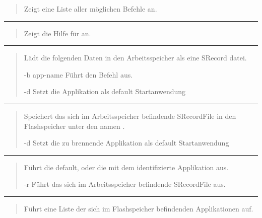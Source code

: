 \documentclass[letterpaper,10pt,ngerman]{manual}
\begin{document}
\begin{quote}

Zeigt eine Liste aller möglichen Befehle an.
\end{quote}


\bigskip\hrule{}\bigskip


\begin{quote}

Zeigt die Hilfe für  an.
\end{quote}


\bigskip\hrule{}\bigskip


\begin{quote}

Lädt die folgenden Daten in den Arbeitsspeicher als eine SRecord datei.
\begin{optionlist}{3cm}
\item [-b app-name]  
Führt den Befehl  aus.
\item [-d]  
Setzt die Applikation als default Startanwendung
\end{optionlist}
\end{quote}


\bigskip\hrule{}\bigskip


\begin{quote}

Speichert das sich im Arbeitsspeicher befindende SRecordFile in den Flashspeicher unter den namen .
\begin{optionlist}{3cm}
\item [-d]  
Setzt die zu brennende Applikation als default Startanwendung
\end{optionlist}
\end{quote}


\bigskip\hrule{}\bigskip


\begin{quote}

Führt die default, oder die mit dem  identifizierte Applikation aus.
\begin{optionlist}{3cm}
\item [-r]  
Führt das sich im Arbeitsspeicher befindende SRecordFile aus.
\end{optionlist}
\end{quote}


\bigskip\hrule{}\bigskip


\begin{quote}

Führt eine Liste der sich im Flashspeicher befindenden Applikationen auf.
\end{quote}
\end{document}
